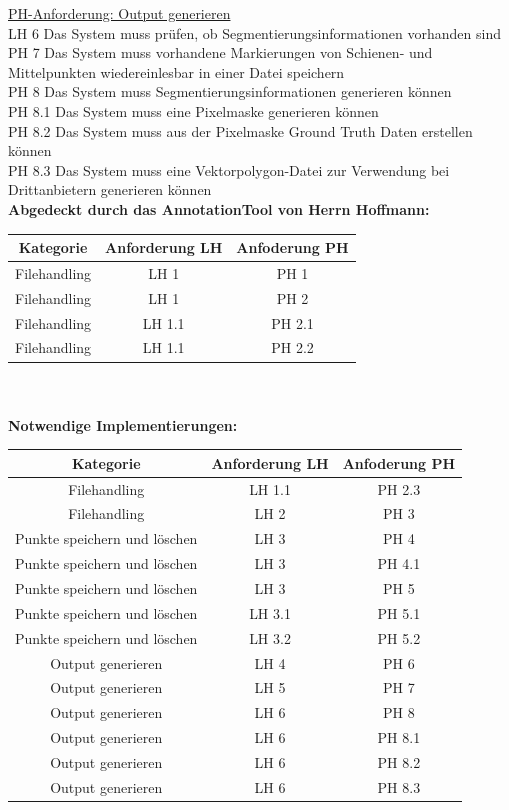 \documentclass[11pt]{scrartcl}
\begin{document}
\noindent
\underline{PH-Anforderung: Output generieren}
\\
\noindent
LH 6    Das System muss prüfen, ob Segmentierungsinformationen vorhanden sind
\\
\noindent
PH 7 Das System muss vorhandene Markierungen von Schienen- und Mittelpunkten wiedereinlesbar in einer Datei speichern
\\
\noindent
PH 8   Das System muss Segmentierungsinformationen generieren können
\\
\noindent
PH 8.1  Das System muss eine Pixelmaske generieren können
\\
\noindent
PH 8.2 Das System muss aus der Pixelmaske Ground Truth Daten erstellen können
\\
\noindent
PH 8.3 Das System muss eine Vektorpolygon-Datei zur Verwendung bei Drittanbietern generieren können
\\

\noindent
\textbf{Abgedeckt durch das AnnotationTool von Herrn Hoffmann:}
\\


\noindent
\begin{tabular}[h]{c|c|c}
Kategorie & Anforderung LH & Anfoderung PH \\
\hline
Filehandling & LH 1 & PH 1 \\
Filehandling & LH 1 & PH 2 \\
Filehandling & LH 1.1 & PH 2.1 \\
Filehandling & LH 1.1 & PH 2.2 \\
\end{tabular}
\\
\\

\noindent
\textbf{Notwendige Implementierungen:}
\\


\noindent
\begin{tabular}[h]{c|c|c}
Kategorie & Anforderung LH & Anfoderung PH \\
\hline
Filehandling & LH 1.1 & PH 2.3\\
Filehandling & LH 2 & PH 3\\
Punkte speichern und löschen & LH 3 & PH 4 \\
Punkte speichern und löschen & LH 3 & PH 4.1 \\
Punkte speichern und löschen & LH 3 & PH 5 \\
Punkte speichern und löschen & LH 3.1 & PH 5.1 \\
Punkte speichern und löschen & LH 3.2 & PH 5.2 \\
Output generieren & LH 4 & PH 6 \\
Output generieren & LH 5 & PH 7 \\
Output generieren & LH 6 & PH 8 \\
Output generieren & LH 6 & PH 8.1 \\
Output generieren & LH 6 & PH 8.2 \\
Output generieren & LH 6 & PH 8.3 \\


\end{tabular}
\end{document}
